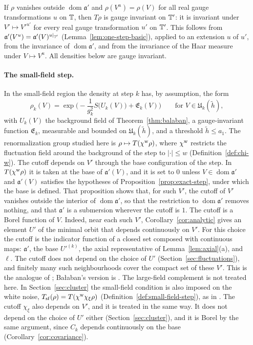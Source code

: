 If $\rho$ vanishes outside $\operatorname{dom}\mathfrak a'$ and $\rho(V^u)=\rho(V)$ for all real gauge transformations $u$ on $\mathbb T$, then $T\rho$ is gauge invariant on $\mathbb T'$: it is invariant under $V'\mapsto V'^{u'}$ for every real gauge transformation $u'$ on $\mathbb T'$. This follows from $\mathfrak a'(V^u)=\mathfrak a'(V)^{u|_{\mathbb T'}}$ (Lemma~\ref{lem:one-step-basic}), applied to an extension $u$ of $u'$, from the invariance of $\operatorname{dom}\mathfrak a'$, and from the invariance of the Haar measure under $V\mapsto V^u$. All densities below are gauge invariant.

\paragraph{The small-field step.} In the small-field region the density at step $k$ has, by assumption, the form
\begin{equation}\label{eq:rho-form}
\rho_k(V)=\exp\Big(-\frac1{g_k^2}S\big(U_k(V)\big)+\mathfrak E_k(V)\Big)\qquad\text{for }V\in\mathfrak U_k(\tilde h),
\end{equation}
with $U_k(V)$ the background field of Theorem~\ref{thm:balaban}, a gauge-invariant function $\mathfrak E_k$, measurable and bounded on $\mathfrak U_k(\tilde h)$, and a threshold $\tilde h\le a_1$. The renormalization group studied here is $\rho\mapsto T(\chi^{\rm w}\rho)$, where $\chi^{\rm w}$ restricts the fluctuation field around the background of the step to $|\cdot|\le w$ (Definition~\ref{def:chi-w}). The cutoff depends on $V'$ through the base configuration of the step. In $T(\chi^{\rm w}\rho)$ it is taken at the base of $\mathfrak a'(V)$, and it is set to $0$ unless $V\in\operatorname{dom}\mathfrak a'$ and $\mathfrak a'(V)$ satisfies the hypotheses of Proposition~\ref{prop:exact-step}, under which the base is defined. That proposition shows that, for such $V'$, the cutoff of $V'$ vanishes outside the interior of $\operatorname{dom}\mathfrak a'$, so that the restriction to $\operatorname{dom}\mathfrak a'$ removes nothing, and that $\mathfrak a'$ is a submersion wherever the cutoff is $1$. The cutoff is a Borel function of $V$. Indeed, near each such $V'$, Corollary~\ref{cor:analytic} gives an element $U'$ of the minimal orbit that depends continuously on $V'$. For this choice the cutoff is the indicator function of a closed set composed with continuous maps: $\mathfrak a'$, the base $U'^{(k)}$, the axial representative of Lemma~\ref{lem:axial}(a), and $\ell$. The cutoff does not depend on the choice of $U'$ (Section~\ref{sec:fluctuations}), and finitely many such neighbourhoods cover the compact set of these $V'$. This is the analogue of \cite[(172)]{DimockI}; Ba\l aban's version is \cite[(7)--(13)]{BalUV3}. The large-field complement is not treated here. In Section~\ref{sec:cluster} the small-field condition is also imposed on the white noise, $T_{\rm sf}(\rho)=T(\chi^{\rm w}\chi_\xi\rho)$ (Definition~\ref{def:small-field-step}), as in \cite[(206)]{DimockI}. The cutoff $\chi_\xi$ also depends on $V'$, and it is treated in the same way. It does not depend on the choice of $U'$ either (Section~\ref{sec:cluster}), and it is Borel by the same argument, since $C_k$ depends continuously on the base (Corollary~\ref{cor:covariance}).


